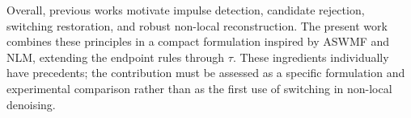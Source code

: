 \documentclass[pdflatex,iicol,sn-mathphys-num]{sn-jnl}
\newif\ifshowportuguese
\newcommand{\pt}[1]{\ifshowportuguese\par\begingroup\small\color{blue!55!black}\noindent\textbf{PT: }#1\par\endgroup\fi}
\begin{document}
Overall, previous works motivate impulse detection, candidate rejection, switching restoration, and robust non-local reconstruction. The present work combines these principles in a compact formulation inspired by ASWMF and NLM, extending the endpoint rules through $\tau$. These ingredients individually have precedents; the contribution must be assessed as a specific formulation and experimental comparison rather than as the first use of switching in non-local denoising.
\pt{De modo geral, os trabalhos anteriores motivam detecção de impulsos, rejeição de candidatos, restauração com chaveamento e reconstrução não local robusta. Este trabalho combina esses princípios em uma formulação compacta inspirada no ASWMF e no NLM, estendendo as regras dos extremos por meio de $\tau$. Esses componentes têm precedentes individualmente; a contribuição deve ser avaliada como uma formulação específica e uma comparação experimental, e não como o primeiro uso de chaveamento no denoising não local.}
\end{document}
